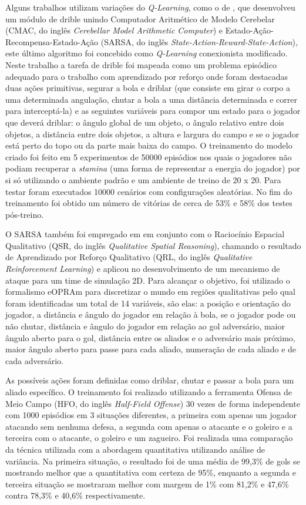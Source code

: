 Alguns trabalhos utilizam variações do \textit{Q-Learning}, como o de 
, que desenvolveu um módulo de drible unindo Computador
Aritmético de Modelo Cerebelar (CMAC, do inglês \textit{Cerebellar Model Arithmetic Computer}) e
Estado-Ação-Recompensa-Estado-Ação (SARSA, do inglês \textit{State-Action-Reward-State-Action}),
este último algoritmo foi concebido como \textit{Q-Learning} conexionista modificado. Neste trabalho
a tarefa de drible foi mapeada como um problema episódico adequado para o trabalho com aprendizado
por reforço onde foram destacadas duas ações primitivas, segurar a bola e driblar (que consiste em
girar o corpo a uma determinada angulação, chutar a bola a uma distância determinada e correr para
interceptá-la) e as seguintes variáveis para compor um estado para o jogador que deverá driblar: o
ângulo global de um objeto, o ângulo relativo entre dois objetos, a distância entre dois objetos, a
altura e largura do campo e se o jogador está perto do topo ou da parte mais baixa do campo. O
treinamento do modelo criado foi feito em 5 experimentos de 50000 episódios nos quais o jogadores
não podiam recuperar a \textit{stamina} (uma forma de representar a energia do jogador) por si só utilizando o ambiente padrão e um ambiente de
treino de 20 x 20. Para testar foram executados 10000 cenários com configurações aleatórias. No fim
do treinamento foi obtido um número de vitórias de cerca de 53\% e 58\% dos testes pós-treino.

O SARSA também foi empregado em  em conjunto com o Raciocínio
Espacial Qualitativo (QSR, do inglês \textit{Qualitative Spatial Reasoning}), chamando o resultado
de Aprendizado por Reforço Qualitativo (QRL, do inglês \textit{Qualitative Reinforcement Learning})
e aplicou no desenvolvimento de um mecanismo de ataque para um time de simulação 2D. Para alcançar o
objetivo, foi utilizado o formalismo eOPRAm para discretizar o mundo em regiões qualitativas pelo
qual foram identificadas um total de 14 variáveis, são elas: a posição e orientação do jogador, a
distância e ângulo do jogador em relação à bola, se o jogador pode ou não chutar, distância e ângulo
do jogador em relação ao gol adversário, maior ângulo aberto para o gol, distância entre os aliados
e o adversário mais próximo, maior ângulo aberto para passe para cada aliado, numeração de cada
aliado e de cada adversário.

As possíveis ações foram definidas como driblar, chutar e passar a bola para um aliado específico. O
treinamento foi realizado utilizando a ferramenta Ofensa de Meio Campo (HFO, do inglês
\textit{Half-Field Offense}) 30 vezes de forma independente com 1000 episódios em 3 situações
diferentes, a primeira com apenas um jogador atacando sem nenhuma defesa, a segunda com apenas o
atacante e o goleiro e a terceira com o atacante, o goleiro e um zagueiro. Foi realizada uma
comparação da técnica utilizada com a abordagem quantitativa utilizando análise de variância. Na
primeira situação, o resultado foi de uma média de 99,3\% de gols se mostrando melhor que a
quantitativa com certeza de 95\%, enquanto a segunda e terceira situação se mostraram melhor com
margem de 1\% com 81,2\% e 47,6\% contra 78,3\% e 40,6\% respectivamente.

